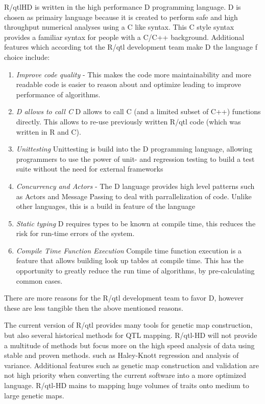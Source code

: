 R/qtlHD is written in the high performance D programming language. D is chosen as primairy language 
because it is created to perform safe and high throughput numerical analyses using a C like syntax. 
This C style syntax provides a familiar syntax for people with a C/C++ background. Additional features which according 
tot the R/qtl development team make D the language f choice include:
\begin{enumerate}\itemsep1pt
\item \emph{Improve code quality} - This makes the code more maintainability and more readable code is 
easier to reason about and optimize leading to improve performance of algorithms.
\item \emph{D allows to call C} D allows to call C (and a limited subset of C++) functions directly. This 
allows to re-use previously written R/qtl code (which was written in R and C).
\item \emph{Unittesting} Unittesting is build into the D programming language, allowing programmers to use the 
power of unit- and regression testing to build a test suite without the need for external 
frameworks
\item \emph{Concurrency and Actors} - The D language provides high level patterns such as Actors and 
Message Passing to deal with parrallelization of code. Unlike other languages, this is a build in 
feature of the language
\item \emph{Static typing} D requires types to be known at compile time, this reduces the risk for 
run-time errors of the system.
\item \emph{Compile Time Function Execution} Compile time function execution is a feature that allows 
building look up tables at compile time. This has the opportunity to greatly reduce the run time of 
algorithms, by pre-calculating common cases.
\end{enumerate}
There are more reasons for the R/qtl development team to favor D, however these are less tangible then 
the above mentioned reasons.

The current version of R/qtl provides many tools for genetic map construction, but also several historical 
methods for QTL mapping. R/qtl-HD will not provide a multitude of methods but focus more on the high speed 
analysis of data using stable and proven methods. such as Haley-Knott regression and analysis of variance.
Additional features such as genetic map construction and validation are not high priority when converting 
the current software into a more optimized language. R/qtl-HD mains to mapping huge volumes of traits onto 
medium to large genetic maps.

